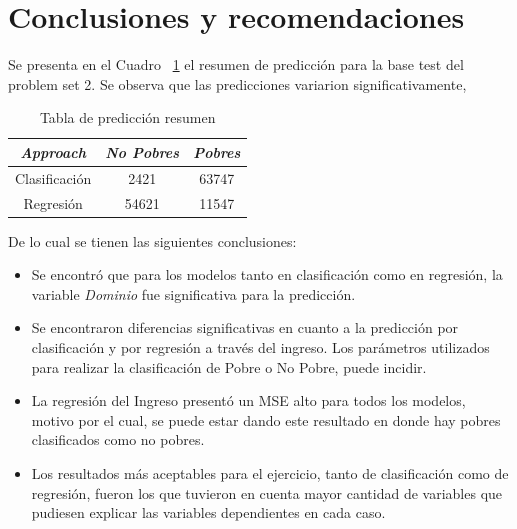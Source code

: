 \documentclass[conference, 10pt]{IEEEtran}
\begin{document}
\section{Conclusiones y recomendaciones}

Se presenta en el Cuadro ~\ref{tab_20} el resumen de predicción para la base test del problem set 2. Se observa que las predicciones variarion significativamente,

\begin{table}[htbp]
\caption{Tabla de predicción resumen}
\begin{center}
\begin{tabular}{|c|c|c|}
\hline
\textbf{\textit{Approach}}&\textbf{\textit{No Pobres}}& \textbf{\textit{Pobres}}\\
\hline
Clasificación&2421&63747\\
\hline
Regresión&54621&11547\\
\hline
\end{tabular}
\label{tab_20}
\end{center}
\end{table}

De lo cual se tienen las siguientes conclusiones:

\begin{itemize}
\item Se encontró que para los modelos tanto en clasificación como en regresión, la variable \textit{Dominio} fue significativa para la predicción.
\item Se encontraron diferencias significativas en cuanto a la predicción por clasificación y por regresión a través del ingreso. Los parámetros utilizados para realizar la clasificación de Pobre o No Pobre, puede incidir.
\item La regresión del Ingreso presentó un MSE alto para todos los modelos, motivo por el cual, se puede estar dando este resultado en donde hay pobres clasificados como no pobres.
\item Los resultados más aceptables para el ejercicio, tanto de clasificación como de regresión, fueron los que tuvieron en cuenta mayor cantidad de variables que pudiesen explicar las variables dependientes en cada caso.
\end{itemize}
\end{document}
